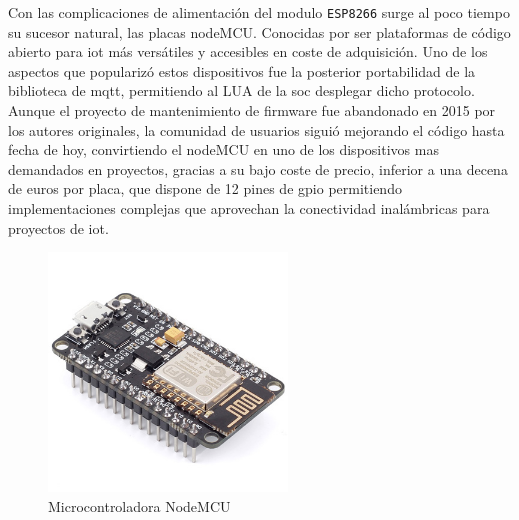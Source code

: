 \vspace{1.5cm}

Con las complicaciones de alimentación del modulo \verb|ESP8266| surge al poco tiempo su sucesor natural, las placas nodeMCU. Conocidas por ser plataformas de código abierto para \gls{iot} más versátiles y accesibles en coste de adquisición. Uno de los aspectos que popularizó estos dispositivos fue la posterior portabilidad de la biblioteca de \gls{mqtt}, permitiendo al LUA de la \gls{soc} desplegar dicho protocolo. Aunque el proyecto de mantenimiento de firmware fue abandonado en 2015 por los autores originales, la comunidad de usuarios siguió mejorando el código hasta fecha de hoy, convirtiendo el nodeMCU en uno de los dispositivos mas demandados en proyectos, gracias a su bajo coste de precio, inferior a una decena de euros por placa, que dispone de 12 pines de \gls{gpio} permitiendo implementaciones complejas que aprovechan la conectividad inalámbricas para proyectos de \gls{iot}.

\begin{figure}[hbt!]
\centering
\includegraphics[height=2.5in]{figures/nodemcu.jpg}
\caption[captura de una nodeMCU]{Microcontroladora NodeMCU\footnotemark}
\end{figure}